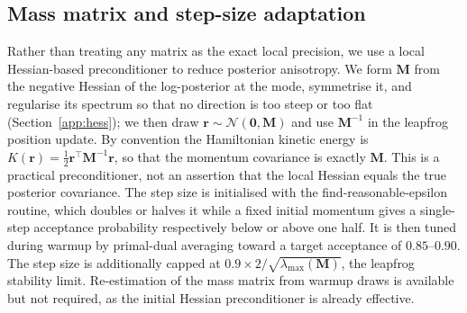 \documentclass[ASNA,twocolumn]{USG}
\begin{document}
\subsection{Mass matrix and step-size adaptation}\label{sec:adapt}
Rather than treating any matrix as the exact local precision, we use a
local Hessian-based preconditioner to reduce posterior anisotropy. We form
$\bm M$ from the negative Hessian of the log-posterior at the mode,
symmetrise it, and regularise its spectrum so that no direction is too
steep or too flat (Section~\ref{app:hess}); we then draw
$\bm r\sim\mathcal N(\bm0,\bm M)$ and use $\bm M^{-1}$ in the leapfrog
position update. By convention the Hamiltonian kinetic energy is
$K(\bm r)=\tfrac12\bm r^{\top}\bm M^{-1}\bm r$, so that the momentum
covariance is exactly $\bm M$. This is a practical preconditioner, not an assertion that
the local Hessian equals the true posterior covariance. The step size is
initialised
with the find-reasonable-epsilon routine, which doubles or halves it while a
fixed initial momentum gives a single-step acceptance probability
respectively below or above one half. It is then tuned during warmup by
primal-dual averaging toward a target acceptance of $0.85$--$0.90$. The step size is additionally
capped at $0.9\times 2/\sqrt{\lambda_{\max}(\bm M)}$, the leapfrog stability
limit. Re-estimation of the mass matrix from warmup draws is available but
not required, as the initial Hessian preconditioner is already effective.
\end{document}
